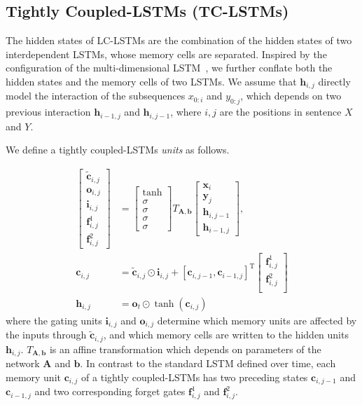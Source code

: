 \documentclass{article}
\def\h{\mathbf{h}}
\def\cc{\mathbf{c}}
\def\cc{\mathbf{c}}
\begin{document}
\subsection{Tightly Coupled-LSTMs (TC-LSTMs)}

The hidden states of LC-LSTMs are the combination of the hidden states of two interdependent LSTMs, whose memory cells are separated. Inspired by the configuration of the multi-dimensional LSTM~\cite{byeon2015scene}, we further conflate both the hidden states and the memory cells of two LSTMs. We assume that $\h_{i,j}$ directly model the interaction of the subsequences $x_{0:i}$ and $y_{0:j}$, which depends on two previous interaction $\h_{i-1,j}$ and $\h_{i,j-1}$, where $i,j$ are the positions in sentence $X$ and $Y$.

We define a tightly coupled-LSTMs \emph{units} as follows.

\begin{align}
	\begin{bmatrix}
		\mathbf{\tilde{c}}_{i,j} \\
		\mathbf{o}_{i,j} \\
		\mathbf{i}_{i,j} \\
		\mathbf{f}_{i,j}^1 \\
		\mathbf{f}_{i,j}^2
	\end{bmatrix}
	&=
	\begin{bmatrix}
		\tanh \\
		\sigma \\
		\sigma \\
		\sigma \\
		\sigma
	\end{bmatrix}
	T_{\mathbf{A},\mathbf{b}}
	\begin{bmatrix}
		\mathbf{x}_{i} \\
        \mathbf{y}_{j} \\
		\mathbf{h}_{i,j - 1} \\
		\mathbf{h}_{i - 1,j}
	\end{bmatrix},\\
	\mathbf{c}_{i,j} &=
		\mathbf{\tilde{c}}_{i,j} \odot \mathbf{i}_{i,j}
		  + [\mathbf{c}_{i,j - 1},\mathbf{c}_{i - 1,j}]^\mathrm{T}
            \begin{bmatrix}
				\mathbf{f}_{i,j}^1 \\
				\mathbf{f}_{i,j}^2 \\
			\end{bmatrix} \\
	\mathbf{h}_{i,j} &= \mathbf{o}_{t}  \odot \tanh\left( \mathbf{c}_{i,j} \right)
\end{align}
where the gating units $\mathbf{i}_{i,j}$ and $\mathbf{o}_{i,j}$
determine which memory units are affected by the inputs through $\mathbf{\tilde{c}}_{i,j}$, and which memory cells are written to the hidden units $\mathbf{h}_{i,j}$.
$T_{\mathbf{A},\mathbf{b}}$ is an affine transformation which depends on parameters of the network $\mathbf{A}$ and $\mathbf{b}$.
In contrast to the standard LSTM defined over time, each memory unit $\cc_{i,j}$ of a tightly coupled-LSTMs has two preceding states
$\mathbf{c}_{i,j-1}$ and $\mathbf{c}_{i-1,j}$ and two corresponding forget gates $\mathbf{f}_{i,j}^1$ and $\mathbf{f}_{i,j}^2$.
\end{document}
